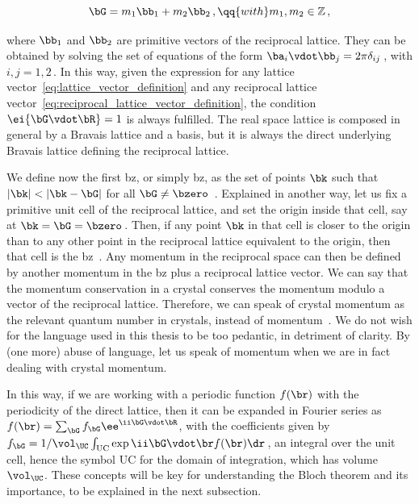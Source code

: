 \begin{equation}
    \label{eq:reciprocal_lattice_vector_definition}
    \bG = m_1 \bb_1 + m_2 \bb_2 \,, \qq{with} m_1,m_2 \in \mathbb{Z}\,,
\end{equation}

\noindent where $\bb_1$ and $\bb_2$ are primitive vectors of the reciprocal lattice.
They can be obtained by solving the set of equations of the form $\ba_i \vdot \bb_j = 2 \pi \delta_{ij}$\,, with $i,j=1,2$\,.
In this way, given the expression for any lattice vector~\eqref{eq:lattice_vector_definition} and any reciprocal lattice vector~\eqref{eq:reciprocal_lattice_vector_definition}, the condition $\ei{\bG \vdot \bR} = 1$ is always fulfilled.
The real space lattice is composed in general by a Bravais lattice and a basis, but it is always the direct underlying Bravais lattice defining the reciprocal lattice.

We define now the first \gls{bz}, or simply \gls{bz}, as the set of points $\bk$ such that $|\bk| < |\bk - \bG|$ for all $\bG \neq \bzero$~\cite{Simon_Oxford_2013,Ashcroft_Mermin}.
Explained in another way, let us fix a primitive unit cell of the reciprocal lattice, and set the origin inside that cell, say at $\bk = \bG = \bzero$\,.
Then, if any point $\bk$ in that cell is closer to the origin than to any other point in the reciprocal lattice equivalent to the origin, then that cell is the \gls{bz}~\cite{Grosso_2014}.
Any momentum in the reciprocal space can then be defined by another momentum in the \gls{bz} plus a reciprocal lattice vector.
We can say that the momentum conservation in a crystal conserves the momentum modulo a vector of the reciprocal lattice.
Therefore, we can speak of crystal momentum as the relevant quantum number in crystals, instead of momentum~\cite{Simon_Oxford_2013}.
We do not wish for the language used in this thesis to be too pedantic, in detriment of clarity.
By (one more) abuse of language, let us speak of momentum when we are in fact dealing with crystal momentum.

In this way, if we are working with a periodic function $f(\br)$ with the periodicity of the direct lattice, then it can be expanded in Fourier series as $f(\br) = \sum_{\bG} f_{\bG} \ee^{\ii \bG \vdot \bR}$, with the coefficients given by $f_{\bG} =1/\vol_{\UC} \int_{\mathrm{UC}} \exp{\ii \bG \vdot \br} f(\br)  \dr$\,, an integral over the unit cell, hence the symbol $\mathrm{UC}$ for the domain of integration, which has volume $\vol_{\UC}$.
These concepts will be key for understanding the Bloch theorem and its importance, to be explained in the next subsection.

